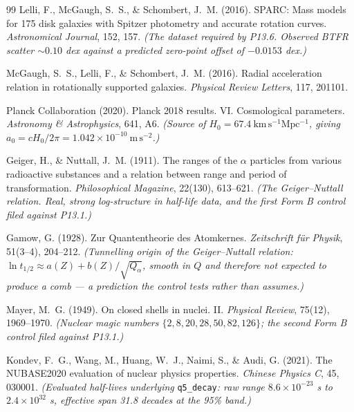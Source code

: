 \documentclass[11pt, letterpaper, openany]{book}
\begin{document}
\begin{thebibliography}{99}
Lelli, F., McGaugh, S.~S., \& Schombert, J.~M. (2016).
SPARC: Mass models for 175 disk galaxies with Spitzer photometry and accurate rotation curves.
\textit{Astronomical Journal}, 152, 157.
\textit{(The dataset required by P13.6. Observed BTFR scatter $\sim 0.10$ dex against a
predicted zero-point offset of $-0.0153$ dex.)}

McGaugh, S.~S., Lelli, F., \& Schombert, J.~M. (2016).
Radial acceleration relation in rotationally supported galaxies.
\textit{Physical Review Letters}, 117, 201101.

Planck Collaboration (2020).
Planck 2018 results. VI. Cosmological parameters.
\textit{Astronomy \& Astrophysics}, 641, A6.
\textit{(Source of $H_0 = 67.4\ \mathrm{km\,s^{-1}Mpc^{-1}}$, giving
$a_0 = cH_0/2\pi = 1.042\times10^{-10}\ \mathrm{m\,s^{-2}}$.)}


Geiger, H., \& Nuttall, J.~M. (1911).
The ranges of the $\alpha$ particles from various radioactive substances and a relation
between range and period of transformation.
\textit{Philosophical Magazine}, 22(130), 613--621.
\textit{(The Geiger--Nuttall relation. Real, strong log-structure in half-life data, and the
first Form B control filed against P13.1.)}

Gamow, G. (1928).
Zur Quantentheorie des Atomkernes.
\textit{Zeitschrift f\"ur Physik}, 51(3--4), 204--212.
\textit{(Tunnelling origin of the Geiger--Nuttall relation:
$\ln t_{1/2} \approx a(Z) + b(Z)/\sqrt{Q_\alpha}$, smooth in $Q$ and therefore not expected to
produce a comb --- a prediction the control tests rather than assumes.)}

Mayer, M.~G. (1949).
On closed shells in nuclei. II.
\textit{Physical Review}, 75(12), 1969--1970.
\textit{(Nuclear magic numbers $\{2, 8, 20, 28, 50, 82, 126\}$; the second Form B control
filed against P13.1.)}

Kondev, F.~G., Wang, M., Huang, W.~J., Naimi, S., \& Audi, G. (2021).
The NUBASE2020 evaluation of nuclear physics properties.
\textit{Chinese Physics C}, 45, 030001.
\textit{(Evaluated half-lives underlying} \texttt{q5\_decay}\textit{: raw range
$8.6\times10^{-23}$ s to $2.4\times10^{32}$ s, effective span 31.8 decades at the 95\% band.)}



\end{thebibliography}
\end{document}
